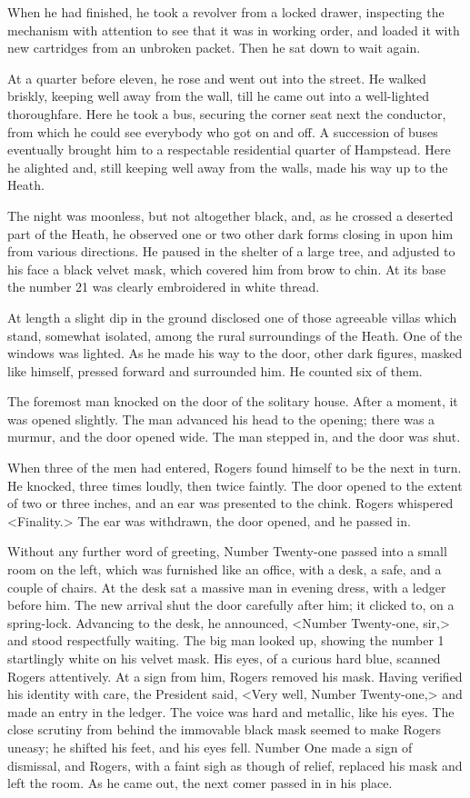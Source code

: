 When he had finished, he took a revolver from a locked drawer, inspecting the mechanism with attention to see that it was in working order, and loaded it with new cartridges from an unbroken packet. Then he sat down to wait again.

At a quarter before eleven, he rose and went out into the street. He walked briskly, keeping well away from the wall, till he came out into a well-lighted thoroughfare. Here he took a bus, securing the corner seat next the conductor, from which he could see everybody who got on and off. A succession of buses eventually brought him to a respectable residential quarter of Hampstead. Here he alighted and, still keeping well away from the walls, made his way up to the Heath.

The night was moonless, but not altogether black, and, as he crossed a deserted part of the Heath, he observed one or two other dark forms closing in upon him from various directions. He paused in the shelter of a large tree, and adjusted to his face a black velvet mask, which covered him from brow to chin. At its base the number 21 was clearly embroidered in white thread.

At length a slight dip in the ground disclosed one of those agreeable villas which stand, somewhat isolated, among the rural surroundings of the Heath. One of the windows was lighted. As he made his way to the door, other dark figures, masked like himself, pressed forward and surrounded him. He counted six of them.

The foremost man knocked on the door of the solitary house. After a moment, it was opened slightly. The man advanced his head to the opening; there was a murmur, and the door opened wide. The man stepped in, and the door was shut.

When three of the men had entered, Rogers found himself to be the next in turn. He knocked, three times loudly, then twice faintly. The door opened to the extent of two or three inches, and an ear was presented to the chink. Rogers whispered <Finality.> The ear was withdrawn, the door opened, and he passed in.

Without any further word of greeting, Number Twenty-one passed into a small room on the left, which was furnished like an office, with a desk, a safe, and a couple of chairs. At the desk sat a massive man in evening dress, with a ledger before him. The new arrival shut the door carefully after him; it clicked to, on a spring-lock. Advancing to the desk, he announced, <Number Twenty-one, sir,> and stood respectfully waiting. The big man looked up, showing the number 1 startlingly white on his velvet mask. His eyes, of a curious hard blue, scanned Rogers attentively. At a sign from him, Rogers removed his mask. Having verified his identity with care, the President said, <Very well, Number Twenty-one,> and made an entry in the ledger. The voice was hard and metallic, like his eyes. The close scrutiny from behind the immovable black mask seemed to make Rogers uneasy; he shifted his feet, and his eyes fell. Number One made a sign of dismissal, and Rogers, with a faint sigh as though of relief, replaced his mask and left the room. As he came out, the next comer passed in in his place.

